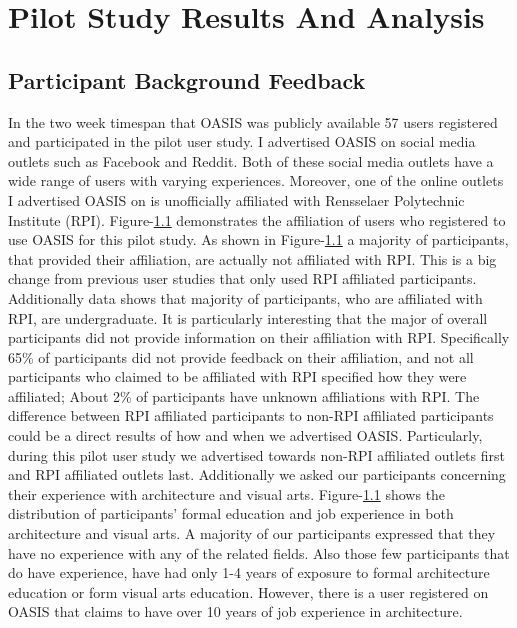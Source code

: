 \chapter{Pilot Study Results And Analysis} \label{sec:results}

\section{Participant Background Feedback}

In the two week timespan that OASIS was publicly available 57 users registered and participated in the pilot user study.
I advertised OASIS on social media outlets such as Facebook and Reddit.
Both of these social media outlets have a wide range of users with varying experiences.
Moreover, one of the online outlets I advertised OASIS on is unofficially affiliated with Rensselaer Polytechnic Institute (RPI).
Figure-\ref{} demonstrates the affiliation of users who registered to use OASIS for this pilot study.
As shown in Figure-\ref{} a majority of participants, that provided their affiliation, are actually not affiliated with RPI. 
This is a big change from previous user studies that only used RPI affiliated participants.
Additionally data shows that majority of participants, who are affiliated with RPI, are undergraduate.
It is particularly interesting that the major of overall participants did not provide information on their affiliation with RPI.
Specifically 65\% of participants did not provide feedback on their affiliation, and not all participants who claimed to be affiliated with RPI specified how they were affiliated;
About 2\% of participants have unknown affiliations with RPI.
The difference between RPI affiliated participants to non-RPI affiliated participants could be a direct results of how and when we advertised OASIS.
Particularly, during this pilot user study we advertised towards non-RPI affiliated outlets first and  RPI affiliated outlets last.
Additionally we asked our participants concerning their experience with architecture and visual arts.
Figure-\ref{} shows the distribution of participants' formal education and job experience in both architecture and visual arts.
A majority of our participants expressed that they have no experience with any of the related fields. 
Also those few participants that do have experience, have had only 1-4 years of exposure to formal architecture education or form visual arts education.
However, there is a user registered on OASIS that claims to have over 10 years of job experience in architecture.

